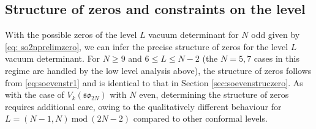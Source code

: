 \subsection{Structure of zeros and constraints on the level}
With the possible zeros of the level $L$ vacuum determinant for $N$ odd given by \eqref{eq: so2nprelimzero}, we can infer the precise structure of zeros for the level $L$ vacuum determinant. For $N \geqslant 9$ and $6 \leqslant L \leqslant N-2$ (the $N = 5,7$ cases in this regime are handled by the low level analysis above), the structure of zeros follows from \eqref{eq:soevenstr1} and is identical to that in Section \ref{sec:soevenstruczero}. As with the case of $V_k(\mathfrak{so}_{2N})$ with $N$ even, determining the structure of zeros requires additional care, owing to the qualitatively different behaviour for $L = (N-1,N)~\text{mod}~(2N-2)$ compared to other conformal levels. 

